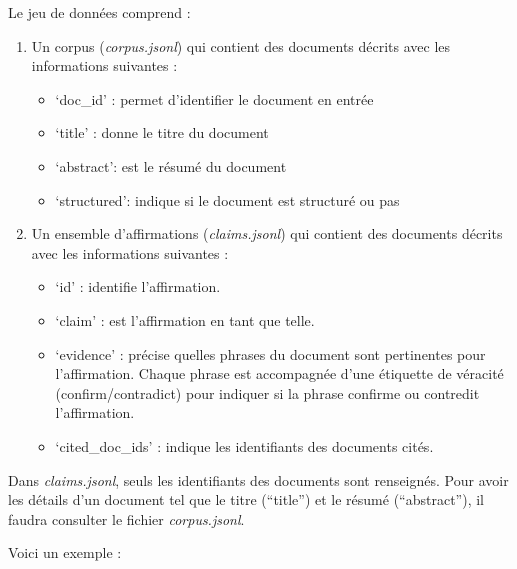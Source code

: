 \documentclass[11pt]{article}
\providecommand{\tightlist}{%
      \setlength{\itemsep}{0pt}\setlength{\parskip}{0pt}}
\begin{document}
Le jeu de données comprend :

\begin{enumerate}
\def\labelenumi{\arabic{enumi}.}
\tightlist
\item
  Un corpus (\emph{corpus.jsonl}) qui contient des documents décrits
  avec les informations suivantes :

  \begin{itemize}
  \tightlist
  \item
    `doc\_id' : permet d'identifier le document en entrée
  \item
    `title' : donne le titre du document
  \item
    `abstract': est le résumé du document
  \item
    `structured': indique si le document est structuré ou pas
  \end{itemize}
\item
  Un ensemble d'affirmations (\emph{claims.jsonl}) qui contient des
  documents décrits avec les informations suivantes :

  \begin{itemize}
  \tightlist
  \item
    `id' : identifie l'affirmation.
  \item
    `claim' : est l'affirmation en tant que telle.
  \item
    `evidence' : précise quelles phrases du document sont pertinentes
    pour l'affirmation. Chaque phrase est accompagnée d'une étiquette de
    véracité (confirm/contradict) pour indiquer si la phrase confirme ou
    contredit l'affirmation.\\
  \item
    `cited\_doc\_ids' : indique les identifiants des documents cités.
  \end{itemize}
\end{enumerate}

Dans \emph{claims.jsonl}, seuls les identifiants des documents sont
renseignés. Pour avoir les détails d'un document tel que le titre
(``title'') et le résumé (``abstract''), il faudra consulter le fichier
\emph{corpus.jsonl}.

Voici un exemple :
\end{document}
